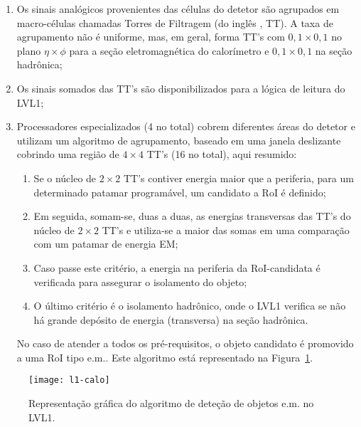 \begin{enumerate}
\item Os sinais analógicos provenientes das células do detetor são agrupados
em macro-células chamadas Torres de Filtragem (do inglês ,
TT). A taxa de agrupamento não é uniforme, mas, em geral, forma TT's com
$0,1\times0,1$ no plano $\eta\times\phi$ para a seção eletromagnética do
calorímetro e $0,1\times0,1$ na seção hadrônica;

\item Os sinais somados das TT's são disponibilizados para a
lógica de leitura do LVL1;

\item Processadores especializados (4 no total) cobrem diferentes áreas do
detetor e utilizam um algoritmo de agrupamento, baseado em uma janela
deslizante \cite{l1-tdr} cobrindo uma região de $4\times4$ TT's (16 no
total), aqui resumido:

\begin{enumerate}
\item Se o núcleo de $2\times2$ TT's contiver energia maior que a
periferia, para um determinado patamar programável, um candidato a RoI é
definido;

\item Em seguida, somam-se, duas a duas, as energias transversas das TT's do
núcleo de $2\times2$ TT's e utiliza-se a maior das somas em uma comparação com
um patamar de energia EM;

\item Caso passe este critério, a energia na periferia da RoI-candidata é
verificada para assegurar o isolamento do objeto; 

\item O último critério é o isolamento hadrônico, onde o LVL1 verifica se não
há grande depósito de energia (transversa) na seção hadrônica.
\end{enumerate}  

No caso de atender a todos os pré-requisitos, o objeto candidato é promovido a
uma RoI tipo e.m.. Este algoritmo está representado na
Figura~\ref{fig:l1-calo}.
\end{enumerate}

\begin{figure}
\begin{center}
\texttt{[image: l1-calo]}
\end{center}
\caption{Representação gráfica do algoritmo de deteção de objetos e.m. no LVL1.}
\label{fig:l1-calo}
\end{figure}

